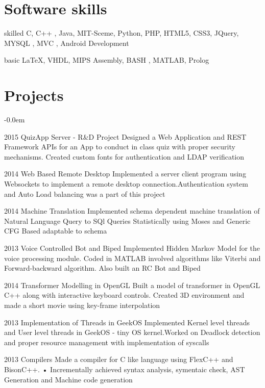 \documentclass[fontsize=10pt]{tccv}
\begin{document}
\vspace{4mm}
\section{Software skills}
\begin{factlist}

\item{skilled}
     {C, C++ , Java, MIT-Sceme, Python, PHP, HTML5, CSS3, JQuery, MYSQL , MVC , Android Development}

\item{basic}
     {\LaTeX , VHDL, MIPS Assembly, BASH , MATLAB, Prolog}

\end{factlist}
\vspace{15mm}
\section{Projects}

\begin{yearlist}
\itemsep -0.0em
\item{2015}
     {QuizApp Server - R\&D Project}
     {Designed a Web Application and REST Framework APIs for an App to conduct in class quiz with proper security mechanisms. Created custom fonts for authentication and LDAP verification
     }

\item{2014}
     {Web Based Remote Desktop}
     {Implemented a server client program using Websockets to implement a remote desktop connection.Authentication system and Auto Load balancing was a part of this project
     }

\item{2014}
     {Machine Translation }
     {Implemented schema dependent machine translation of Natural Language Query to SQl Queries Statistically using Moses and Generic CFG Based adaptable to schema
     }
     
\item{2013}
     {Voice Controlled Bot and Biped}
     {Implemented Hidden Markov Model for the voice processing module. Coded in MATLAB involved algorithms like Viterbi and Forward-backward algorithm. Also built an RC Bot and Biped
     }

\item{2014}
     {Transformer Modelling in OpenGL}
     {Built a model of transformer in OpenGL C++ along with interactive keyboard controls. Created 3D environment and made a short movie using key-frame interpolation
     }

\item{2013}
     {Implementation of Threads in GeekOS}
     {Implemented Kernel level threads and User level threads in GeekOS - tiny OS kernel.Worked on Deadlock detection and proper resource management with implementation of syscalls
     }

\item{2013}
     {Compilers}
     {Made a compiler for C like language using FlexC++ and BisonC++. • Incrementally achieved syntax analysis, symentaic check, AST Generation and Machine code generation
     }
\end{yearlist}
\end{document}
